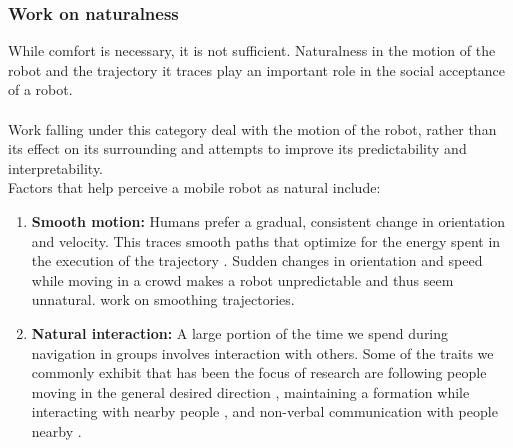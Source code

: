 \subsubsection{Work on naturalness}
While comfort is necessary, it is not sufficient. Naturalness in the motion of the robot and the trajectory it traces play an important role in the social acceptance of a robot. \\
\\Work falling under this category deal with the motion of the robot, rather than its effect on its surrounding and attempts to improve its predictability and interpretability.\\ %
Factors that help perceive a mobile robot as natural include:
\begin{enumerate}
    \item \textbf{Smooth motion:} Humans prefer a gradual, consistent change in orientation and velocity. This traces smooth paths that optimize for the energy spent in the execution of the trajectory \cite{arechavaleta_nonholonomic_2008}. Sudden changes in orientation and speed while moving in a crowd makes a robot unpredictable and thus seem unnatural. \cite{pandey_alami_robot_guide_2009, pandey_2010_human_centered_nav} work on smoothing trajectories.
    \item \textbf{Natural interaction:} A large portion of the time we spend during navigation in groups involves interaction with others. Some of the traits we commonly exhibit that has been the focus of research are following people moving in the general desired direction \cite{gockley_natural_person_following_2007}, maintaining a formation while interacting with nearby people \cite{althaus_nav_for_human_robot_interaction_2004}, and non-verbal communication with people nearby \cite{sauliner_minimal_nonverbal_interruption_2011}. 
    
\end{enumerate}
